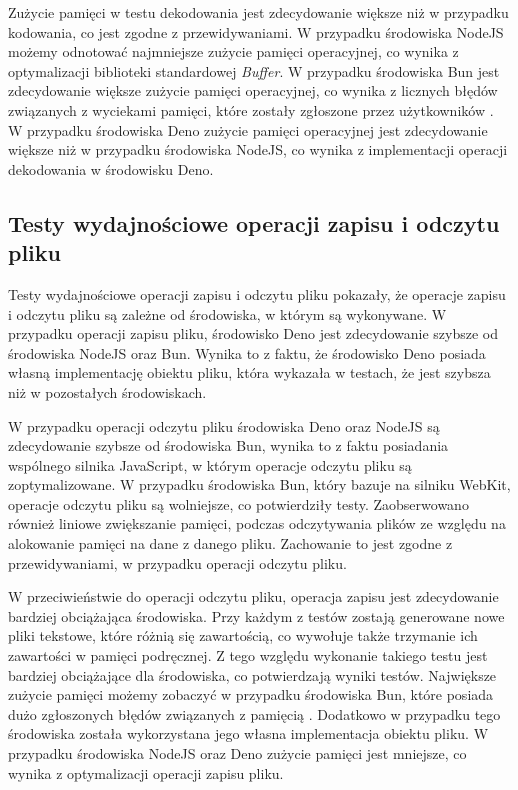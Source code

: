 Zużycie pamięci w testu dekodowania jest zdecydowanie większe niż w przypadku kodowania, co jest zgodne z przewidywaniami. W przypadku środowiska NodeJS możemy odnotować najmniejsze zużycie pamięci operacyjnej, co wynika z optymalizacji biblioteki standardowej \textit{Buffer}. W przypadku środowiska Bun jest zdecydowanie większe zużycie pamięci operacyjnej, co wynika z licznych błędów związanych z wyciekami pamięci, które zostały zgłoszone przez użytkowników \cite{bun_memory}. W przypadku środowiska Deno zużycie pamięci operacyjnej jest zdecydowanie większe niż w przypadku środowiska NodeJS, co wynika z implementacji operacji dekodowania w środowisku Deno.

\subsection{Testy wydajnościowe operacji zapisu i odczytu pliku}
Testy wydajnościowe operacji zapisu i odczytu pliku pokazały, że operacje zapisu i odczytu pliku są zależne od środowiska, w którym są wykonywane. W przypadku operacji zapisu pliku, środowisko Deno jest zdecydowanie szybsze od środowiska NodeJS oraz Bun. Wynika to z faktu, że środowisko Deno posiada własną implementację obiektu pliku, która wykazała w testach, że jest szybsza niż w pozostałych środowiskach.

W przypadku operacji odczytu pliku środowiska Deno oraz NodeJS są zdecydowanie szybsze od środowiska Bun, wynika to z faktu posiadania wspólnego silnika JavaScript, w którym operacje odczytu pliku są zoptymalizowane. W przypadku środowiska Bun, który bazuje na silniku WebKit, operacje odczytu pliku są wolniejsze, co potwierdziły testy. Zaobserwowano również liniowe zwiększanie pamięci, podczas odczytywania plików ze względu na alokowanie pamięci na dane z danego pliku. Zachowanie to jest zgodne z przewidywaniami, w przypadku operacji odczytu pliku.

W przeciwieństwie do operacji odczytu pliku, operacja zapisu jest zdecydowanie bardziej obciążająca środowiska. Przy każdym z testów zostają generowane nowe pliki tekstowe, które różnią się zawartością, co wywołuje także trzymanie ich zawartości w pamięci podręcznej. Z tego względu wykonanie takiego testu jest bardziej obciążające dla środowiska, co potwierdzają wyniki testów. Największe zużycie pamięci możemy zobaczyć w przypadku środowiska Bun, które posiada dużo zgłoszonych błędów związanych z pamięcią \cite{bun_memory}. Dodatkowo w przypadku tego środowiska została wykorzystana jego własna implementacja obiektu pliku. W przypadku środowiska NodeJS oraz Deno zużycie pamięci jest mniejsze, co wynika z optymalizacji operacji zapisu pliku.


